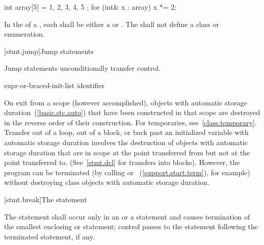 \enterexample
\begin{codeblock}
int array[5] = { 1, 2, 3, 4, 5 };
for (int& x : array)
  x *= 2;
\end{codeblock}
\exitexample%

\pnum
In the  of a ,
each  shall be either a 
or . The  shall not define a
class or enumeration.

[stmt.jump]{Jump statements}%

\pnum
Jump statements unconditionally transfer control.
%

%
%
%
%
%
%
\begin{bnf}
\br
    \br
    \br
     expr-or-braced-init-list\opt{} \terminal{;}\br
     identifier \terminal{;}
\end{bnf}

\pnum
{}%
%
On exit from a scope (however accomplished), objects with automatic storage
duration~(\ref{basic.stc.auto}) that have been constructed in that scope are destroyed
in the reverse order of their construction. \enternote For temporaries,
see~\ref{class.temporary}. \exitnote Transfer out of a loop, out of a block, or back
past
an initialized variable with automatic storage duration involves the
destruction of objects with automatic storage duration that are in
scope at the point transferred from but not at the point transferred to.
(See~\ref{stmt.dcl} for transfers into blocks).
\enternote
However, the program can be terminated (by calling
%
%
 or
%
%
~(\ref{support.start.term}), for example) without
destroying class objects with automatic storage duration.
\exitnote

[stmt.break]{The  statement}%

\pnum
The  statement shall occur only in an
%
%
 or a  statement and causes
termination of the smallest enclosing  or
 statement; control passes to the statement following the
terminated statement, if any.

